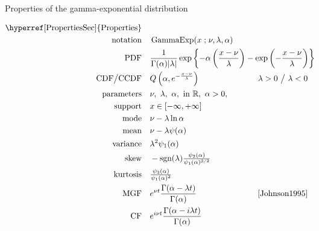 

\begin{table*}[tp!]
\caption[Gamma-exponential distribution -- Properties]{Properties of the gamma-exponential distribution}
\begin{align*}
\text{\hyperref[PropertiesSec]{Properties}}  \quad& \\
\text{notation} \quad &  \op{GammaExp}(x \given \nu, \lambda, \alpha)  			\checked
\\
\text{PDF}\quad &   \frac{1}{ \Gamma(\alpha) |\lambda|}  \exp\left\{- \alpha \left(\frac{x-\nu}{\lambda}\right) - \exp\left(-\frac{x-\nu}{\lambda}\right)  \right\} \checked \hspace{-8em}												
\\
\text{CDF} \big/ \text{CCDF} \quad  &   Q\left(\alpha, e^{-\frac{x-\nu}{\lambda} }\right) 
& \lambda>0 \ \big/ \ \lambda<0  \checked
\\
\text{parameters}\quad &   \nu,\ \lambda,\ \alpha,\   \text{in } \Real, \ \alpha>0, \ 		\checked
\\
\text{support} \quad &   x \in [-\infty, +\infty]									\checked
\\
\text{mode} \quad  & \nu -\lambda \ln \alpha \checked
\\
\text{mean} \quad  &   \nu- \lambda \psi(\alpha)	\checked
\\
\text{variance} \quad  &  \lambda^2 \psi_1(\alpha)	\checked
\\
\text{skew} \quad  &   -\text{sgn}(\lambda) \tfrac{\psi_2(\alpha) }{  \psi_1(\alpha)^{3/2} }  \checked
\\
\text{kurtosis} \quad  &     \tfrac{ \psi_3(\alpha) }{  \psi_1(\alpha)^{2}} \checked
\\
\text{MGF} \quad  &   e^{\nu t } \frac{\Gamma(\alpha-\lambda t)}{\Gamma(\alpha)}  \checked
& \text{\cite{Johnson1995}}  %
\\
\text{CF} \quad  &  e^{i \nu t } \frac{\Gamma(\alpha-i \lambda t)}{\Gamma(\alpha)} \checked
\end{align*}
\end{table*}


